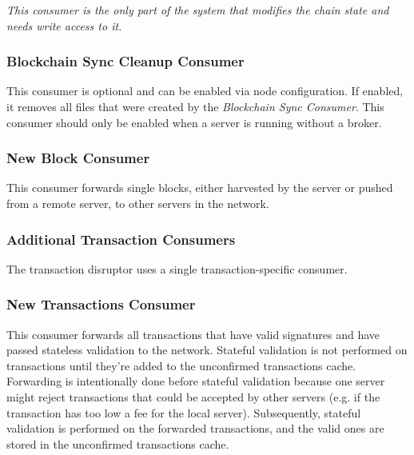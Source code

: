 \emph{This consumer is the only part of the \codenamespace system that modifies the chain state and needs write access to it.}

\subsubsection*{Blockchain Sync Cleanup Consumer}
This consumer is optional and can be enabled via node configuration.
If enabled, it removes all files that were created by the {\it Blockchain Sync Consumer}.
This consumer should only be enabled when a server is running without a broker.

\subsubsection*{New Block Consumer}
This consumer forwards single blocks, either harvested by the server or pushed from a remote server, to other servers in the network.

\subsubsection{Additional Transaction Consumers}
The transaction disruptor uses a single transaction-specific consumer.

\subsubsection*{New Transactions Consumer}
This consumer forwards all transactions that have valid signatures and have passed stateless validation to the network.
Stateful validation is not performed on transactions until they're added to the unconfirmed transactions cache.
Forwarding is intentionally done before stateful validation because one server might reject transactions that could be accepted by other servers (e.g. if the transaction has too low a fee for the local server).
Subsequently, stateful validation is performed on the forwarded transactions, and the valid ones are stored in the unconfirmed transactions cache.
